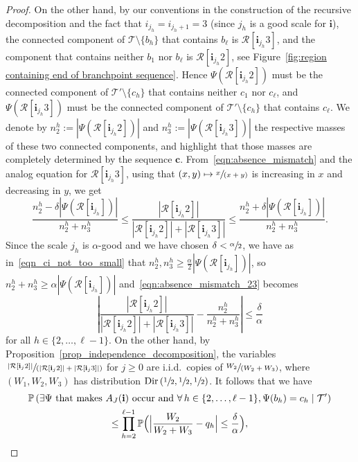 \documentclass[JEP,XML,SOM,Unicode,NoFloatCountersInSection,published]{cedram}
\let\backslash\setminus
\newcommand{\spfrac}[2]{\sfrac{#1}{(#2)}}
\newcommand{\BPp}[1]{\mathbb{P} \Bigl(#1\Bigr)}
\newcommand{\Ppsq}[2]{\mathbb{P} \left(#1\mathrel{}\middle|\mathrel{}#2\right)}
\newcommand{\Tt}{\mathcal{T}}
\newcommand{\Rr}{\mathcal{R}}
\newcommand{\ii}{\mathbf{i}}
\newcommand{\Dir}{\mathrm{Dir}}
\theoremstyle{plain}
\theoremstyle{definition}
\begin{document}
\begin{proof}
On the other hand, by our conventions in the construction of the recursive decomposition and the fact that $i_{j_h}=i_{j_h+1}=3$ (since $j_h$ is a good scale for $\ii$), the connected component of $\Tt \backslash\{ b_h \}$ that contains $b_{\ell}$ is $\Rr[\ii_{j_h}3]$, and the component that contains neither $b_1$ nor $b_{\ell}$ is $\Rr[\ii_{j_h}2]$, see Figure~\ref{fig:region containing end of branchpoint sequence}.
Hence $\Psi \left( \Rr[\ii_{j_h}2] \right)$ must be the connected component of $\Tt' \backslash \{c_h\}$ that contains neither $c_1$ nor $c_{\ell}$, and $\Psi \left( \Rr[\ii_{j_h}3] \right)$ must be the connected component of $\Tt' \backslash \{c_h\}$ that contains $c_{\ell}$.
We denote by $n^h_2:=|\Psi \left( \Rr[\ii_{j_h}2] \right)|$ and $n^h_3:=|\Psi \left( \Rr[\ii_{j_h} 3] \right)|$ the respective masses of these two connected components, and highlight that those masses are completely determined by the sequence $\mathbf{c}$.
From~\eqref{eqn:absence_mismatch} and the analog equation for $\Rr[\ii_{j_h}3]$, using that $(x,y) \mapsto \spfrac{x}{x+y}$ is increasing in $x$ and decreasing in $y$, we get
\begin{equation}\label{eqn:absence_mismatch_23}
\frac{n^{h}_2 - \delta \left| \Psi \left( \Rr[\ii_{j_h}] \right) \right|}{n^{h}_2+n^{h}_3} \leq \frac{\left| \Rr[\ii_{j_h}2] \right|}{\left| \Rr[\ii_{j_h}2] \right|+\left| \Rr[\ii_{j_h}3] \right|} \leq \frac{n^{h}_2+\delta \left| \Psi \left( \Rr[\ii_{j_h}] \right) \right|}{n^{h}_2+n^{h}_3}.
\end{equation}
Since the scale $j_h$ is $\alpha$-good and we have chosen $\delta<\sfrac{\alpha}{2}$, we have as in~\eqref{eqn_ci_not_too_small} that $n^{h}_2, n^h_3 \geq \frac{\alpha}{2} \left| \Psi \left( \Rr[\ii_{j_h}] \right) \right|$, so $n_2^h+n_3^h \geq \alpha \left| \Psi \left( \Rr[\ii_{j_h}] \right) \right|$ and~\eqref{eqn:absence_mismatch_23} becomes
\[ \left| \frac{\left| \Rr[\ii_{j_h}2] \right|}{\left| \Rr[\ii_{j_h}2] \right|+\left| \Rr[\ii_{j_h}3] \right|}-\frac{n^{h}_2}{n^{h}_2+n^{h}_3} \right| \leq \frac{\delta}{\alpha} \]
for all $h\in\{2,\dots,\ell-1\}$. On the other hand, by Proposition~\ref{prop_independence_decomposition}, the variables $\spfrac{\left| \Rr[\ii_{j}2] \right|}{\left| \Rr[\ii_{j}2] \right|+\left| \Rr[\ii_{j}3] \right|}$ for $j \geq 0$ are i.i.d.\ copies of $\spfrac{W_2}{W_2+W_3}$, where $(W_1, W_2, W_3)$ has distribution $\Dir \left( \sfrac12, \sfrac12, \sfrac12 \right)$.
It follows that we have
\begin{multline*}
\Ppsq{\exists \Psi \text{ that makes $A_J(\ii)$ occur and }\forall \, h\in\{2,\dots,\ell-1\}, \Psi(b_h)=c_h}{ \mathcal{T'}} \\ \leq \prod_{h=2}^{\ell-1} \BPp{ \Bigl| \frac{W_2}{W_2+W_3}-q_h \Bigr| \leq \frac{\delta}{\alpha} },

\end{multline*}
\end{proof}
\end{document}
